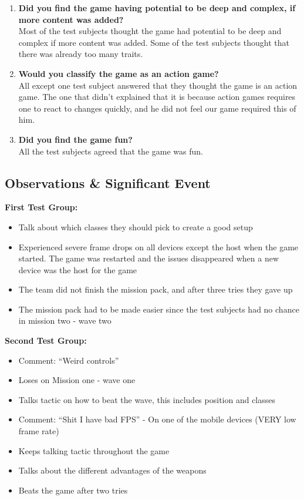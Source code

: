 \begin{enumerate}
\item \textbf{Did you find the game having potential to be deep and complex, if more content was added?}\vspace{4pt}\\
Most of the test subjects thought the game had potential to be deep and complex if more content was added.
Some of the test subjects thought that there was already too many traits.

\item \textbf{Would you classify the game as an action game?}\vspace{4pt}\\
All except one test subject answered that they thought the game is an action game.
The one that didn't explained that it is because action games requires one to react to changes quickly, and he did not feel our game required this of him.

\item \textbf{Did you find the game fun?}\vspace{4pt}\\
All the test subjects agreed that the game was fun.
\end{enumerate}

\subsection{Observations \& Significant Event}
\textbf{First Test Group:}\\
\begin{itemize}
\item Talk about which classes they should pick to create a good setup
\item Experienced severe frame drops on all devices except the host when the game started. The game was restarted and the issues disappeared when a new device was the host for the game
\item The team did not finish the mission pack, and after three tries they gave up
\item The mission pack had to be made easier since the test subjects had no chance in mission two - wave two
\end{itemize}

\textbf{Second Test Group:}\\
\begin{itemize}
\item Comment: ``Weird controls''
\item Loses on Mission one - wave one
\item Talks tactic on how to beat the wave, this includes position and classes
\item Comment: ``Shit I have bad FPS'' - On one of the mobile devices (VERY low frame rate)
\item Keeps talking tactic throughout the game
\item Talks about the different advantages of the weapons
\item Beats the game after two tries
\end{itemize}


